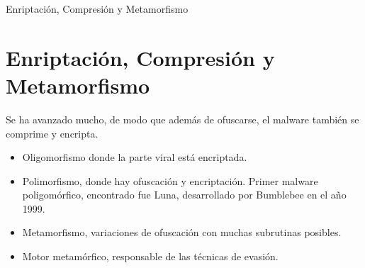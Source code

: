 \documentclass[aspectratio=169]{beamer}
\begin{document}
    \begin{frame}{Enriptación, Compresión y Metamorfismo}
    \section{Enriptación, Compresión y Metamorfismo}
    Se ha avanzado mucho, de modo que además de ofuscarse, el malware también se comprime y encripta.
  	  	\begin{itemize}
  	  		\item Oligomorfismo donde la parte viral está encriptada.
  	  		\item Polimorfismo, donde hay ofuscación y encriptación. Primer malware poligomórfico, encontrado fue Luna, desarrollado por Bumblebee en el año 1999.
  	  		\item Metamorfismo, variaciones de ofuscación con muchas subrutinas posibles.
  	  		\item Motor metamórfico, responsable de las técnicas de evasión.    			
   		\end{itemize}
	\end{frame}
	
\end{document}
